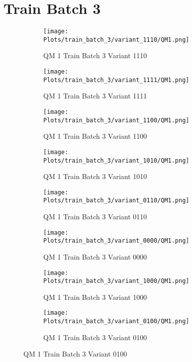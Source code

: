 \documentclass{DissertateFigs}
\begin{document}
\section{Train Batch 3}
\begin{figure}[t!]
    \begin{subfigure}{0.47\textwidth}
    \texttt{[image: Plots/train\_batch\_3/variant\_1110/QM1.png]}
    \caption{QM 1 Train Batch 3 Variant 1110}
    \end{subfigure}
    \begin{subfigure}{0.47\textwidth}
    \texttt{[image: Plots/train\_batch\_3/variant\_1111/QM1.png]}
    \caption{QM 1 Train Batch 3 Variant 1111}
    \end{subfigure}

\medskip

    \begin{subfigure}{0.47\textwidth}
    \texttt{[image: Plots/train\_batch\_3/variant\_1100/QM1.png]}
    \caption{QM 1 Train Batch 3 Variant 1100}
    \end{subfigure}
    \begin{subfigure}{0.47\textwidth}
    \texttt{[image: Plots/train\_batch\_3/variant\_1010/QM1.png]}
    \caption{QM 1 Train Batch 3 Variant 1010}
    \end{subfigure}

\medskip

    \begin{subfigure}{0.47\textwidth}
    \texttt{[image: Plots/train\_batch\_3/variant\_0110/QM1.png]}
    \caption{QM 1 Train Batch 3 Variant 0110}
    \end{subfigure}
    \begin{subfigure}{0.47\textwidth}
    \texttt{[image: Plots/train\_batch\_3/variant\_0000/QM1.png]}
    \caption{QM 1 Train Batch 3 Variant 0000}
    \end{subfigure}

\medskip

    \begin{subfigure}{0.47\textwidth}
    \texttt{[image: Plots/train\_batch\_3/variant\_1000/QM1.png]}
    \caption{QM 1 Train Batch 3 Variant 1000}
    \end{subfigure}
    \begin{subfigure}{0.47\textwidth}
    \texttt{[image: Plots/train\_batch\_3/variant\_0100/QM1.png]}
    \caption{QM 1 Train Batch 3 Variant 0100}
    \end{subfigure}


\end{figure}
\end{document}
